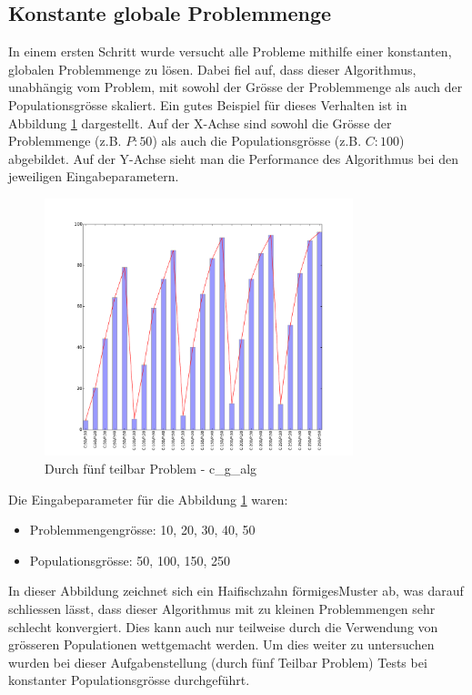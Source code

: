 \subsection{Konstante globale Problemmenge}
In einem ersten Schritt wurde versucht alle Probleme mithilfe einer konstanten, globalen Problemmenge zu lösen. Dabei fiel auf, dass dieser Algorithmus, unabhängig vom Problem, mit sowohl der Grösse der Problemmenge als auch der Populationsgrösse skaliert. Ein gutes Beispiel für dieses Verhalten ist in Abbildung \ref{fig:c_g_div5} dargestellt. Auf der X-Achse sind sowohl die Grösse der Problemmenge (z.B. $P:50$) als auch die Populationsgrösse (z.B. $C:100$) abgebildet. Auf der Y-Achse sieht man die Performance des Algorithmus bei den jeweiligen Eingabeparametern.

\begin{figure}[h]
  \centering
  \includegraphics[width=0.8\textwidth]{images/C_G_div5_solved.pdf}
  \caption[Durch fünf teilbar Problem - \Gls{c_g_alg}]{Durch fünf teilbar Problem - \Gls{c_g_alg}}
  \label{fig:c_g_div5}
\end{figure}

Die Eingabeparameter für die Abbildung \ref{fig:c_g_div5} waren:
\begin{itemize}
	\item Problemmengengrösse: 10, 20, 30, 40, 50
	\item Populationsgrösse: 50, 100, 150, 250
\end{itemize}

In dieser Abbildung zeichnet sich ein \flqq Haifischzahn förmiges\frqq Muster ab, was darauf schliessen lässt, dass dieser Algorithmus mit zu kleinen Problemmengen sehr schlecht konvergiert. Dies kann auch nur teilweise durch die Verwendung von grösseren Populationen wettgemacht werden. Um dies weiter zu untersuchen wurden bei dieser Aufgabenstellung (\flqq durch fünf Teilbar Problem\frqq) Tests bei konstanter Populationsgrösse durchgeführt. 

